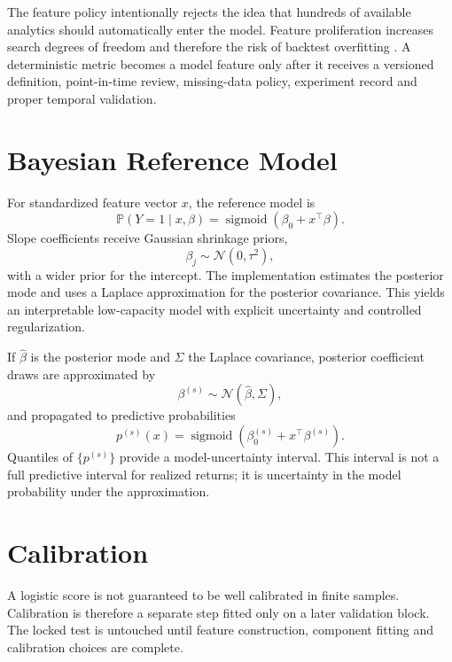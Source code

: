 \documentclass[11pt]{article}
\newcommand{\Prb}{\mathbb{P}}
\newcommand{\sigmoid}{\operatorname{sigmoid}}
\begin{document}
The feature policy intentionally rejects the idea that hundreds of available analytics should automatically enter the model. Feature proliferation increases search degrees of freedom and therefore the risk of backtest overfitting \citep{white2000reality,harvey2016crosssection,bailey2017pbo}. A deterministic metric becomes a model feature only after it receives a versioned definition, point-in-time review, missing-data policy, experiment record and proper temporal validation.

\section{Bayesian Reference Model}
For standardized feature vector $x$, the reference model is
\begin{equation}
\Prb(Y=1\mid x,\beta)=\sigmoid(\beta_0+x^\top\beta).
\end{equation}
Slope coefficients receive Gaussian shrinkage priors,
\begin{equation}
\beta_j\sim\mathcal{N}(0,\tau^2),
\end{equation}
with a wider prior for the intercept. The implementation estimates the posterior mode and uses a Laplace approximation for the posterior covariance. This yields an interpretable low-capacity model with explicit uncertainty and controlled regularization.

If $\hat\beta$ is the posterior mode and $\Sigma$ the Laplace covariance, posterior coefficient draws are approximated by
\begin{equation}
\beta^{(s)}\sim\mathcal{N}(\hat\beta,\Sigma),
\end{equation}
and propagated to predictive probabilities
\begin{equation}
p^{(s)}(x)=\sigmoid(\beta_0^{(s)}+x^\top\beta^{(s)}).
\end{equation}
Quantiles of $\{p^{(s)}\}$ provide a model-uncertainty interval. This interval is not a full predictive interval for realized returns; it is uncertainty in the model probability under the approximation.

\section{Calibration}
A logistic score is not guaranteed to be well calibrated in finite samples. Calibration is therefore a separate step fitted only on a later validation block. The locked test is untouched until feature construction, component fitting and calibration choices are complete.
\end{document}
